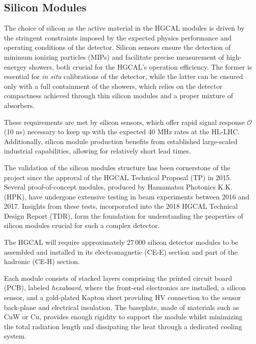 \subsection{Silicon Modules}
\label{sec:Silicon Modules}

The choice of silicon as the active material in the HGCAL modules is driven by the stringent constraints imposed by the expected physics performance and operating conditions of the detector. 
Silicon sensors ensure the detection of minimum ionizing particles (MIPs) and facilitate precise measurement of high-energey showers, both crucial for the HGCAL's operation efficiency. The former is essential for \textit{in situ} calibrations of the detector, while the latter can be ensured only with a full containment of the showers, which relies on the detector compactness achieved through thin silicon modules and a proper mixture of absorbers.

These requirements are met by silicon sensors, which offer rapid signal response $\mathcal{O}$(10 ns) necessary to keep up with the expected 40 MHz rates at the HL-LHC. Additionally, silicon module production benefits from established large-scaled industrial capabilities, allowing for relatively short lead times.

The validation of the silicon modules structure has been cornerstone of the project since the approval of the HGCAL Technical Proposal (TP) in 2015. Several proof-of-concept modules, produced by Hamamatsu Photonics K.K. (HPK), have undergone extensive testing in beam experiments between 2016 and 2017. Insights from these tests, incorporated into the 2018 HGCAL Technical Design Report (TDR), form the foundation for understanding the properties of silicon modules crucial for such a complex detector.

\bigbreak

The HGCAL will require approximately $27\,000$ silicon detector modules to be assembled and installed in its electromagnetic (CE-E) section and part of the hadronic (CE-H) section.

Each module consists of stacked layers comprising the printed circuit board (PCB), labeled \textit{hexaboard}, where the front-end electronics are installed, a silicon sensor, and a gold-plated Kapton sheet providing HV connection to the sensor back-plane and electrical insulation. The baseplate, made of materials such as CuW or Cu, provides enough rigidity to support the module whilst minimizing the total radiation length and dissipating the heat through a dedicated cooling system.

